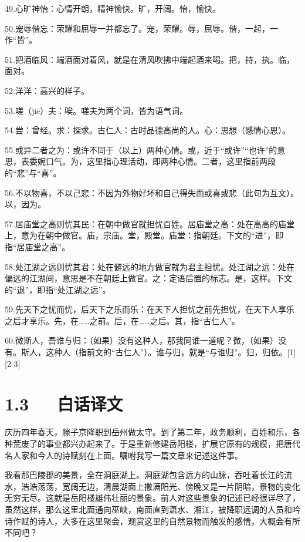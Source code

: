 \documentclass[letterpaper,12pt,english]{sphinxmanual}
\begin{document}
49.心旷神怡：心情开朗，精神愉快。旷，开阔。怡，愉快。

50.宠辱偕忘：荣耀和屈辱一并都忘了。宠，荣耀。辱，屈辱。偕，一起，一作“皆”。

51.把酒临风：端酒面对着风，就是在清风吹拂中端起酒来喝。把，持，执。临，面对。

52.洋洋：高兴的样子。

53.嗟（jiē）夫：唉。嗟夫为两个词，皆为语气词。

54.尝：曾经。求：探求。古仁人：古时品德高尚的人。心：思想（感情心思）。

55.或异二者之为：或许不同于（以上）两种心情。或，近于“或许”“也许”的意思，表委婉口气。为，这里指心理活动，即两种心情。二者，这里指前两段的“悲”与“喜”。

56.不以物喜，不以己悲：不因为外物好坏和自己得失而或喜或悲（此句为互文）。以，因为。

57.居庙堂之高则忧其民：在朝中做官就担忧百姓。居庙堂之高：处在高高的庙堂上，意为在朝中做官。庙，宗庙。堂，殿堂。庙堂：指朝廷。下文的“进”，即指“居庙堂之高”。

58.处江湖之远则忧其君：处在僻远的地方做官就为君主担忧。处江湖之远：处在偏远的江湖间，意思是不在朝廷上做官。之：定语后置的标志。是，这样。下文的“退”，即指“处江湖之远”。

59.先天下之忧而忧，后天下之乐而乐：在天下人担忧之前先担忧，在天下人享乐之后才享乐。先，在……之前。后，在……之后。其，指“古仁人”。

60.微斯人，吾谁与归：（如果）没有这种人，那我同谁一道呢？微，（如果）没有。斯人，这种人（指前文的“古仁人”）。谁与归，就是“与谁归”。归，归依。{[}1{]}{[}2-3{]}


\section{1.3   白话译文}
\label{\detokenize{p01_u6563_u6587/_u8303_u4ef2_u6df9-_u5cb3_u9633_u697c_u8bb0:id5}}
庆历四年春天，滕子京降职到岳州做太守。到了第二年，政务顺利，百姓和乐，各种荒废了的事业都兴办起来了。于是重新修建岳阳楼，扩展它原有的规模，把唐代名人家和今人的诗赋刻在上面。嘱咐我写一篇文章来记述这件事。

我看那巴陵郡的美景，全在洞庭湖上。洞庭湖包含远方的山脉，吞吐着长江的流水，浩浩荡荡，宽阔无边，清晨湖面上撒满阳光、傍晚又是一片阴暗，景物的变化无穷无尽。这就是岳阳楼雄伟壮丽的景象。前人对这些景象的记述已经很详尽了，虽然这样，那么这里北面通向巫峡，南面直到潇水、湘江，被降职远调的人员和吟诗作赋的诗人，大多在这里聚会，观赏这里的自然景物而触发的感情，大概会有所不同吧？
\end{document}
